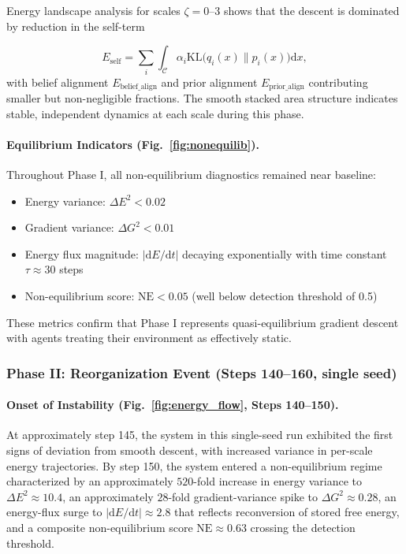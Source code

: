\documentclass[11pt]{article}
\begin{document}
Energy landscape analysis for scales $\zeta = 0$--3 shows that the descent is dominated by reduction in the self-term

\begin{equation}
E_{\text{self}} = \sum_i \int_{\mathcal{C}} \alpha_i  \mathrm{KL}\big(q_i(x) \| p_i(x)\big)  \mathrm{d}x,
\end{equation}
with belief alignment $E_{\text{belief\_align}}$ and prior alignment $E_{\text{prior\_align}}$ contributing smaller but non-negligible fractions. The smooth stacked area structure indicates stable, independent dynamics at each scale during this phase.

\paragraph{Equilibrium Indicators (Fig.~\ref{fig:nonequilib}).}
Throughout Phase I, all non-equilibrium diagnostics remained near baseline:
\begin{itemize}
\item Energy variance: $\Delta E^2 < 0.02$
\item Gradient variance: $\Delta G^2 < 0.01$
\item Energy flux magnitude: $|\mathrm{d}E/\mathrm{d}t|$ decaying exponentially with time constant $\tau \approx 30$ steps
\item Non-equilibrium score: $\mathrm{NE} < 0.05$ (well below detection threshold of 0.5)
\end{itemize}
These metrics confirm that Phase I represents quasi-equilibrium gradient descent with agents treating their environment as effectively static.

\subsubsection{Phase II: Reorganization Event (Steps 140--160, single seed)}

\paragraph{Onset of Instability (Fig.~\ref{fig:energy_flow}, Steps 140--150).}
At approximately step 145, the system in this single-seed run exhibited the first signs of deviation from smooth descent, with increased variance in per-scale energy trajectories. By step 150, the system entered a non-equilibrium regime characterized by an approximately $520$-fold increase in energy variance to $\Delta E^2 \approx 10.4$, an approximately $28$-fold gradient-variance spike to $\Delta G^2 \approx 0.28$, an energy-flux surge to $|\mathrm{d}E/\mathrm{d}t| \approx 2.8$ that reflects reconversion of stored free energy, and a composite non-equilibrium score $\mathrm{NE} \approx 0.63$ crossing the detection threshold.
\end{document}
